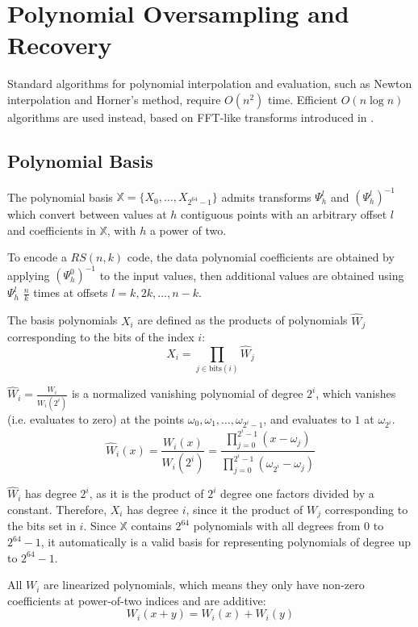 \chapter{Polynomial Oversampling and Recovery}

Standard algorithms for polynomial interpolation and evaluation, such as Newton interpolation and Horner's method, require $O(n^2)$ time.
Efficient $O(n \log n)$ algorithms are used instead, based on FFT-like transforms introduced in \cite{novel-poly}.

\section{Polynomial Basis}

The polynomial basis $\mathbb{X} = \{X_0, \ldots, X_{2^{64} - 1}\}$ admits transforms $\Psi_h^l$ and $(\Psi_h^l)^{-1}$ which convert between values at $h$ contiguous points with an arbitrary offset $l$ and coefficients in $\mathbb{X}$, with $h$ a power of two.

To encode a $RS(n, k)$ code, the data polynomial coefficients are obtained by applying $(\Psi_h^0)^{-1}$ to the input values, then additional values are obtained using $\Psi_h^l$ $\frac{n}{k}$ times at offsets $l = k, 2k, \ldots, n - k$.

The basis polynomials $X_i$ are defined as the products of polynomials $\hat{W}_j$ corresponding to the bits of the index $i$:
\[X_i = \prod_{j \in \text{bits}(i)} \hat{W}_j\]

$\hat{W}_i = \frac{W_i}{W_i(2^{i})}$ is a normalized vanishing polynomial of degree $2^{i}$, which vanishes (i.e. evaluates to zero) at the points $\omega_0, \omega_1, \ldots, \omega_{2^{i} - 1}$, and evaluates to $1$ at $\omega_{2^{i}}$.
\[\hat{W}_i(x) = \frac{W_i(x)}{W_i(2^{i})} = \frac{\prod_{j = 0}^{2^i - 1} (x - \omega_j)}{\prod_{j = 0}^{2^i - 1} (\omega_{2^i} - \omega_j)}\]

$\hat{W}_i$ has degree $2^{i}$, as it is the product of $2^{i}$ degree one factors divided by a constant. Therefore, $X_i$ has degree $i$, since it the product of $W_j$ corresponding to the bits set in $i$.
Since $\mathbb{X}$ contains $2^{64}$ polynomials with all degrees from $0$ to $2^{64} - 1$, it automatically is a valid basis for representing polynomials of degree up to $2^{64} - 1$.

All $W_i$ are linearized polynomials, which means they only have non-zero coefficients at power-of-two indices and are additive:
\[W_i(x + y) = W_i(x) + W_i(y)\]

